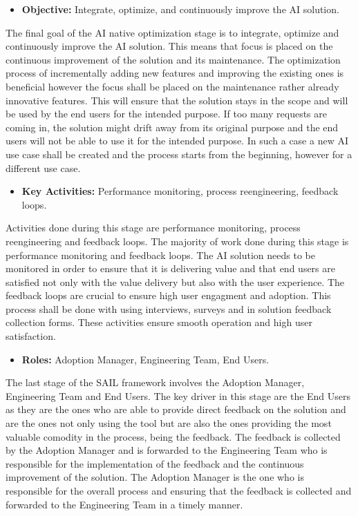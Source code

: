 \documentclass[]{imc-inf}
\def\tightlist{}
\begin{document}
\begin{itemize}
	\tightlist
	\item
	\textbf{Objective:} Integrate, optimize, and continuously improve the
	AI solution.
\end{itemize}

The final goal of the AI native optimization stage is to integrate,
optimize and continuously improve the AI solution. This means that focus
is placed on the continuous improvement of the solution and its
maintenance. The optimization process of incrementally adding new
features and improving the existing ones is beneficial however the focus
shall be placed on the maintenance rather already innovative features.
This will ensure that the solution stays in the scope and will be used
by the end users for the intended purpose. If too many requests are
coming in, the solution might drift away from its original purpose and
the end users will not be able to use it for the intended purpose. In
such a case a new AI use case shall be created and the process starts
from the beginning, however for a different use case.

\begin{itemize}
	\tightlist
	\item
	\textbf{Key Activities:} Performance monitoring, process
	reengineering, feedback loops.
\end{itemize}

Activities done during this stage are performance monitoring, process
reengineering and feedback loops. The majority of work done during this
stage is performance monitoring and feedback loops. The AI solution
needs to be monitored in order to ensure that it is delivering value and
that end users are satisfied not only with the value delivery but also
with the user experience. The feedback loops are crucial to ensure high
user engagment and adoption. This process shall be done with using
interviews, surveys and in solution feedback collection forms. These
activities ensure smooth operation and high user satisfaction.

\begin{itemize}
	\tightlist
	\item
	\textbf{Roles:} Adoption Manager, Engineering Team, End Users.
\end{itemize}

The last stage of the SAIL framework involves the Adoption Manager,
Engineering Team and End Users. The key driver in this stage are the End
Users as they are the ones who are able to provide direct feedback on
the solution and are the ones not only using the tool but are also the
ones providing the most valuable comodity in the process, being the
feedback. The feedback is collected by the Adoption Manager and is
forwarded to the Engineering Team who is responsible for the
implementation of the feedback and the continuous improvement of the
solution. The Adoption Manager is the one who is responsible for the
overall process and ensuring that the feedback is collected and
forwarded to the Engineering Team in a timely manner.
\end{document}
